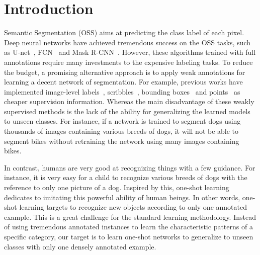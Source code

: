 \documentclass[journal]{IEEEtran}
\begin{document}
\IEEEpeerreviewmaketitle




\section{Introduction}
Semantic Segmentation (OSS) aims at predicting the class label of each pixel.
Deep neural networks have achieved tremendous success on the OSS tasks, such as U-net~\cite{ronneberger2015u}, FCN~\cite{2015-long} and Mask R-CNN~\cite{he2017mask}.
However, these algorithms trained with full annotations require many investments to the expensive labeling tasks.
To reduce the budget, a promising alternative approach is to apply weak annotations for learning a decent network of segmentation.
For example, previous works have implemented image-level labels~\cite{wei2018revisiting,wei2017object,wei2015stc}, scribbles~\cite{lin2016scribblesup,tang2018normalized,wang2019boundary}, bounding boxes~\cite{khoreva2017simple,dai2015boxsup} and points~\cite{bearman2016s,tang2018weakly,qian2019weakly} as cheaper supervision information.
Whereas the main disadvantage of these weakly supervised methods is the lack of the ability for generalizing the learned models to unseen classes.
For instance, if a network is trained to segment dogs using thousands of images containing various breeds of dogs, it will not be able to segment bikes without retraining the network using many images containing bikes.

In contrast, humans are very good at recognizing things with a few guidance.
For instance, it is very easy for a child to recognize various breeds of dogs with the reference to only one picture of a dog.
Inspired by this, one-shot learning dedicates to imitating this powerful ability of human beings.
In other words, one-shot learning targets to recognize new objects according to only one annotated example.
This is a great challenge for the standard learning methodology.
Instead of using tremendous annotated instances to learn the characteristic patterns of a specific category, our target is to learn one-shot networks to generalize to unseen classes with only one densely annotated example.
\end{document}
